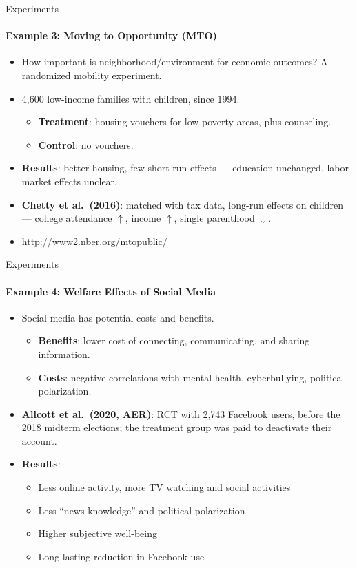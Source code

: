 \documentclass[11pt,aspectratio=169]{beamer}
\begin{document}
\begin{frame}{Experiments}
  \framesubtitle{Example 3: Moving to Opportunity (MTO)}
  \begin{itemize}
    \item How important is neighborhood/environment for economic outcomes? A randomized mobility experiment.
    \item 4{,}600 low-income families with children, since 1994.
    \begin{itemize}
      \item \textbf{Treatment}: housing vouchers for low-poverty areas, plus counseling.
      \item \textbf{Control}: no vouchers.
    \end{itemize}
    \item \textbf{Results}: better housing, few short-run effects --- education unchanged, labor-market effects unclear.
    \item \textbf{Chetty et al.\ (2016)}: matched with tax data, long-run effects on children --- college attendance $\uparrow$, income $\uparrow$, single parenthood $\downarrow$.
    \item \url{http://www2.nber.org/mtopublic/}
  \end{itemize}
\end{frame}

\begin{frame}{Experiments}
  \framesubtitle{Example 4: Welfare Effects of Social Media}
  \begin{itemize}
    \item Social media has potential costs and benefits.
    \begin{itemize}
      \item \textbf{Benefits}: lower cost of connecting, communicating, and sharing information.
      \item \textbf{Costs}: negative correlations with mental health, cyberbullying, political polarization.
    \end{itemize}
    \item \textbf{Allcott et al.\ (2020, AER)}: RCT with 2{,}743 Facebook users, before the 2018 midterm elections; the treatment group was paid to deactivate their account.
    \item \textbf{Results}:
    \begin{itemize}
      \item Less online activity, more TV watching and social activities
      \item Less ``news knowledge'' and political polarization
      \item Higher subjective well-being
      \item Long-lasting reduction in Facebook use
    \end{itemize}
  \end{itemize}
\end{frame}
\end{document}
